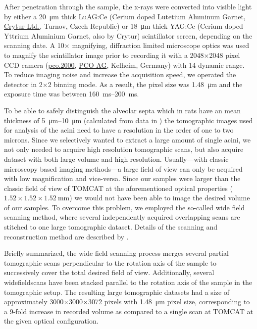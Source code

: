 \documentclass[%
	twoside,
	paper=a4,%
	abstract=true,%
	]{scrartcl}
\begin{document}
After penetration through the sample, the x-rays were converted into visible light by either a \SI{20}{\micro\meter} thick LuAG:Ce (Cerium doped Lutetium Aluminum Garnet, \href{http://www.crytur.cz/}{Crytur Ltd.}, Turnov, Czech Republic) or \SI{18}{\micro\meter} thick YAG:Ce (Cerium doped Yttrium Aluminium Garnet, also by Crytur) scintillator screen, depending on the scanning date. A 10\(\times\) magnifying, diffraction limited microscope optics was used to magnify the scintillator image prior to recording it with a 2048\(\times\)2048 pixel CCD camera (\href{http://www.pco.de/sensitive-cameras/pco2000/}{pco.2000}, \href{http://www.pco.de/}{PCO AG}, Kelheim, Germany) with \SI{14}{\bit} dynamic range. To reduce imaging noise and increase the acquisition speed, we operated the detector in 2\(\times\)2 binning mode. As a result, the pixel size was \SI{1.48}{\micro\meter} and the exposure time was between \SIrange{160}{200}{\milli\second}.

To be able to safely distinguish the alveolar septa which in rats have an mean thickness of \SIrange{5}{10}{\micro\meter} (calculated from data in \citet{Burri1974}) the tomographic images used for analysis of the acini need to have a resolution in the order of one to two microns. Since we selectively wanted to extract a large amount of single acini, we not only needed to acquire high resolution tomographic scans, but also acquire dataset with both large volume and high resolution. Usually---with classic microscopy based imaging methods---a large field of view can only be acquired with low magnification and vice-versa. Since our samples were larger than the classic field of view of TOMCAT at the aforementioned optical properties (\(1.52\times1.52\times\SI{1.52}{\milli\meter}\)) we would not have been able to image the desired volume of our samples. To overcome this problem, we employed the so-called wide field scanning method, where several independently acquired overlapping scans are stitched to one large tomographic dataset. Details of the scanning and reconstruction method are described by \citet{Haberthuer2010a}. 

Briefly summarized, the wide field scanning process merges several partial tomographic scans perpendicular to the rotation axis of the sample to successively cover the total desired field of view. Additionally, several widefieldscans have been stacked parallel to the rotation axis of the sample in the tomographic setup. The resulting large tomographic datasets had a size of approximately 3000\(\times\)3000\(\times\)3072 pixels with \SI{1.48}{\micro\meter} pixel size, corresponding to a 9-fold increase in recorded volume as compared to a single scan at TOMCAT at the given optical configuration.
\end{document}
